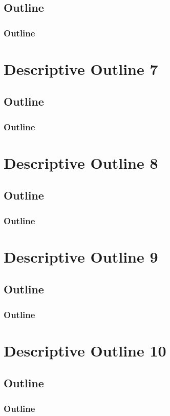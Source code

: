 \documentclass[
    aspectratio=169
]{beamer}
\begin{document}
\subsection{Outline}
\begin{frame}
\frametitle{Outline}
\end{frame}
\section{Descriptive Outline 7}
\subsection{Outline}
\begin{frame}
\frametitle{Outline}
\end{frame}
\section{Descriptive Outline 8}
\subsection{Outline}
\begin{frame}
\frametitle{Outline}
\end{frame}
\section{Descriptive Outline 9}
\subsection{Outline}
\begin{frame}
\frametitle{Outline}
\end{frame}
\section{Descriptive Outline 10}
\subsection{Outline}
\begin{frame}
\frametitle{Outline}
\end{frame}
\end{document}
